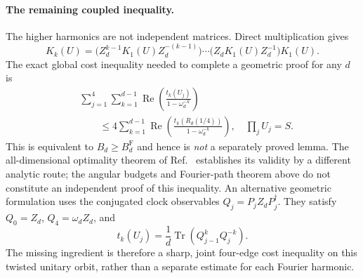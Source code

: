 \documentclass[aps,prl,reprint,superscriptaddress,nofootinbib]{revtex4-2}
\newcommand{\Tr}{\operatorname{Tr}}
\begin{document}
\paragraph{The remaining coupled inequality.}
The higher harmonics are not independent matrices. Direct multiplication gives
\begin{equation}
K_k(U)=\bigl(Z_d^{k-1}K_1(U)Z_d^{-(k-1)}\bigr)\cdots
\bigl(Z_dK_1(U)Z_d^{-1}\bigr)K_1(U).
\label{eqS:Kiterate}
\end{equation}
The exact global cost inequality needed to complete a geometric proof for any $d$ is
\begin{equation}
\begin{split}
&\sum_{j=1}^{4}\sum_{k=1}^{d-1}
\operatorname{Re}\!\left(\frac{t_k(U_j)}{1-\omega_d^{-k}}\right)\\
&\qquad\leq4\sum_{k=1}^{d-1}
\operatorname{Re}\!\left(\frac{t_k(R_d(1/4))}{1-\omega_d^{-k}}\right),
\quad \prod_jU_j=S.
\end{split}
\label{eqS:missing}
\end{equation}
This is equivalent to $B_d\geq B_d^{\mathrm F}$ and hence is \emph{not} a separately proved lemma. The all-dimensional optimality theorem of Ref.~\cite{TurtureanBao} establishes its validity by a different analytic route; the angular budgets and Fourier-path theorem above do not constitute an independent proof of this inequality. An alternative geometric formulation uses the conjugated clock observables $Q_j=P_jZ_dP_j^\dagger$. They satisfy $Q_0=Z_d$, $Q_4=\omega_d Z_d$, and
\begin{equation}
t_k(U_j)=\frac1d\Tr(Q_{j-1}^{k}Q_j^{-k}).
\label{eqS:orbit}
\end{equation}
The missing ingredient is therefore a sharp, joint four-edge cost inequality on this twisted unitary orbit, rather than a separate estimate for each Fourier harmonic.
\end{document}
